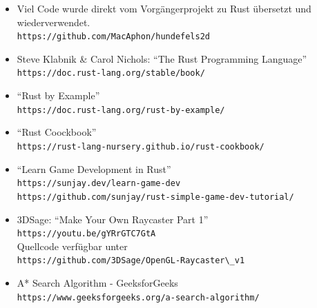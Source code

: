 \documentclass[a4paper,titlepage]{article}
\begin{document}
    \begin{itemize}
        \item Viel Code wurde direkt vom Vorgängerprojekt zu Rust übersetzt und wiederverwendet. \\
        \verb|https://github.com/MacAphon/hundefels2d|
        
        \item Steve Klabnik \& Carol Nichols: ``The Rust Programming Language'' \\
        \verb|https://doc.rust-lang.org/stable/book/|
        
        \item ``Rust by Example'' \\
        \verb|https://doc.rust-lang.org/rust-by-example/|
        
        \item ``Rust Coockbook'' \\
        \verb|https://rust-lang-nursery.github.io/rust-cookbook/|
        
        \item ``Learn Game Development in Rust'' \\
        \verb|https://sunjay.dev/learn-game-dev| \\
        \verb|https://github.com/sunjay/rust-simple-game-dev-tutorial/|
        
        \item 3DSage: ``Make Your Own Raycaster Part 1'' \\ 
        \verb|https://youtu.be/gYRrGTC7GtA|\\ 
        Quellcode verfügbar unter \\
        \verb|https://github.com/3DSage/OpenGL-Raycaster\_v1|
        
        \item A* Search Algorithm - GeeksforGeeks \\
        \verb|https://www.geeksforgeeks.org/a-search-algorithm/|
    \end{itemize}
    
\end{document}
